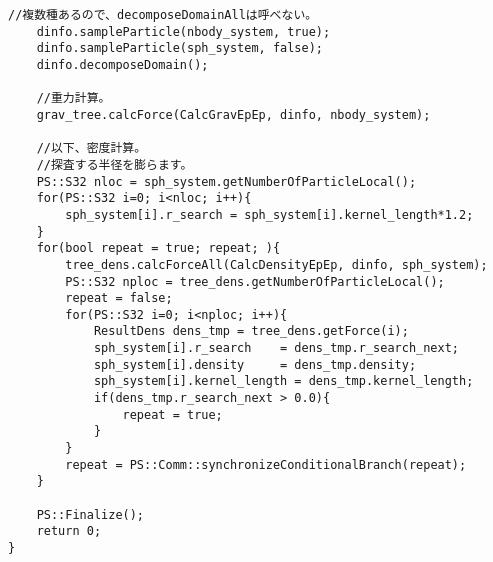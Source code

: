 \begin{lstlisting}[caption=$N$体＋SPHシミュレーションのサンプルコード]
    //複数種あるので、decomposeDomainAllは呼べない。
    dinfo.sampleParticle(nbody_system, true);
    dinfo.sampleParticle(sph_system, false);
    dinfo.decomposeDomain();

    //重力計算。
    grav_tree.calcForce(CalcGravEpEp, dinfo, nbody_system);

    //以下、密度計算。
    //探査する半径を膨らます。
    PS::S32 nloc = sph_system.getNumberOfParticleLocal();
    for(PS::S32 i=0; i<nloc; i++){
        sph_system[i].r_search = sph_system[i].kernel_length*1.2;
    }
    for(bool repeat = true; repeat; ){
        tree_dens.calcForceAll(CalcDensityEpEp, dinfo, sph_system);
        PS::S32 nploc = tree_dens.getNumberOfParticleLocal();
        repeat = false;
        for(PS::S32 i=0; i<nploc; i++){
            ResultDens dens_tmp = tree_dens.getForce(i);
            sph_system[i].r_search    = dens_tmp.r_search_next;
            sph_system[i].density     = dens_tmp.density;
            sph_system[i].kernel_length = dens_tmp.kernel_length;
            if(dens_tmp.r_search_next > 0.0){
                repeat = true;
            }
        }
        repeat = PS::Comm::synchronizeConditionalBranch(repeat);
    }

    PS::Finalize();
    return 0;
}

\end{lstlisting}
